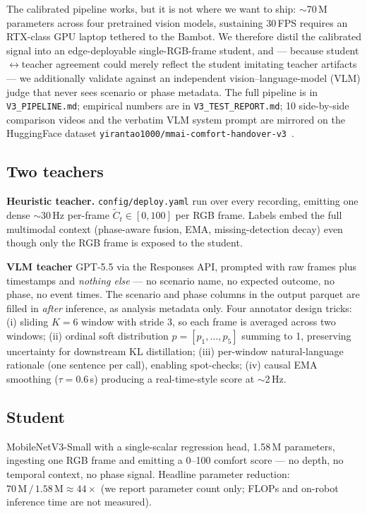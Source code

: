 \documentclass{article}
\newcommand{\code}[1]{\texttt{\small #1}}
\begin{document}
The calibrated pipeline works, but it is not where we want to ship: $\sim$70\,M parameters across four pretrained vision models, sustaining 30\,FPS requires an RTX-class GPU laptop tethered to the Bambot. We therefore distil the calibrated signal into an edge-deployable single-RGB-frame student, and --- because student$\leftrightarrow$teacher agreement could merely reflect the student imitating teacher artifacts --- we additionally validate against an independent vision--language-model (VLM) judge that never sees scenario or phase metadata. The full pipeline is in \code{V3\_PIPELINE.md}; empirical numbers are in \code{V3\_TEST\_REPORT.md}; 10 side-by-side comparison videos and the verbatim VLM system prompt are mirrored on the HuggingFace dataset \code{yirantao1000/mmai-comfort-handover-v3}~\cite{ref29}.

\subsection{Two teachers}

\textbf{Heuristic teacher.} \code{config/deploy.yaml} run over every recording, emitting one dense $\sim$30\,Hz per-frame $\tilde{C}_t \in [0, 100]$ per RGB frame. Labels embed the full multimodal context (phase-aware fusion, EMA, missing-detection decay) even though only the RGB frame is exposed to the student.

\textbf{VLM teacher} GPT-5.5 via the Responses API, prompted with raw frames plus timestamps and \emph{nothing else} --- no scenario name, no expected outcome, no phase, no event times. The scenario and phase columns in the output parquet are filled in \emph{after} inference, as analysis metadata only. Four annotator design tricks: (i) sliding $K=6$ window with stride 3, so each frame is averaged across two windows; (ii) ordinal soft distribution $p=[p_1,\dots,p_5]$ summing to 1, preserving uncertainty for downstream KL distillation; (iii) per-window natural-language rationale (one sentence per call), enabling spot-checks; (iv) causal EMA smoothing ($\tau = 0.6$\,s) producing a real-time-style score at $\sim$2\,Hz.

\subsection{Student}

MobileNetV3-Small with a single-scalar regression head, 1.58\,M parameters, ingesting one RGB frame and emitting a 0--100 comfort score --- no depth, no temporal context, no phase signal. Headline parameter reduction: $70\,\text{M}\,/\,1.58\,\text{M} \approx 44\times$ (we report parameter count only; FLOPs and on-robot inference time are not measured).
\end{document}
